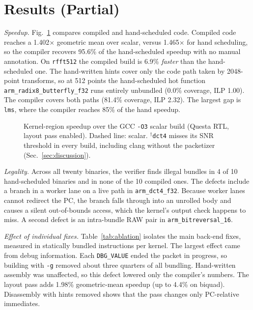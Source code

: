 \documentclass[conference]{IEEEtran}
\begin{document}
\section{Results (Partial)}
\emph{Speedup.} Fig.~\ref{fig:speedup} compares compiled and hand-scheduled code. Compiled code reaches a 1.402$\times$ geometric mean over scalar, versus 1.465$\times$ for hand scheduling, so the compiler recovers 95.6\% of the hand-scheduled speedup with no manual annotation. On \texttt{rfft512} the compiled build is 6.9\% \emph{faster} than the hand-scheduled one. The hand-written hints cover only the code path taken by 2048-point transforms, so at 512 points the hand-scheduled hot function \texttt{arm\_radix8\_butterfly\_f32} runs entirely unbundled (0.0\% coverage, ILP 1.00). The compiler covers both paths (81.4\% coverage, ILP 2.32). The largest gap is \texttt{lms}, where the compiler reaches 85\% of the hand speedup.

\begin{figure}[t]
\centering

\caption{Kernel-region speedup over the GCC \texttt{-O3} scalar build (Questa RTL, layout pass enabled). Dashed line: scalar. $^\dagger$\texttt{dct4} misses its SNR threshold in every build, including clang without the packetizer (Sec.~\ref{sec:discussion}).}
\label{fig:speedup}
\end{figure}

\emph{Legality.} Across all twenty binaries, the verifier finds illegal bundles in 4 of 10 hand-scheduled binaries and in none of the 10 compiled ones. The defects include a branch in a worker lane on a live path in \texttt{arm\_dct4\_f32}. Because worker lanes cannot redirect the PC, the branch falls through into an unrolled body and causes a silent out-of-bounds access, which the kernel's output check happens to miss. A second defect is an intra-bundle RAW pair in \texttt{arm\_bitreversal\_16}.

\emph{Effect of individual fixes.} Table~\ref{tab:ablation} isolates the main back-end fixes, measured in statically bundled instructions per kernel. The largest effect came from debug information. Each \texttt{DBG\_VALUE} ended the packet in progress, so building with \texttt{-g} removed about three quarters of all bundling. Hand-written assembly was unaffected, so this defect lowered only the compiler's numbers. The layout pass adds 1.98\% geometric-mean speedup (up to 4.4\% on biquad). Disassembly with hints removed shows that the pass changes only PC-relative immediates.
\end{document}
